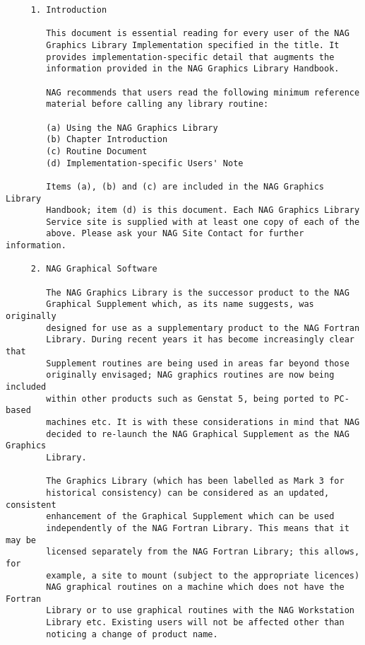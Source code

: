 \begin{verbatim}
     1. Introduction
     
        This document is essential reading for every user of the NAG
        Graphics Library Implementation specified in the title. It
        provides implementation-specific detail that augments the
        information provided in the NAG Graphics Library Handbook.
     
        NAG recommends that users read the following minimum reference
        material before calling any library routine:

        (a) Using the NAG Graphics Library
        (b) Chapter Introduction
        (c) Routine Document
        (d) Implementation-specific Users' Note
     
        Items (a), (b) and (c) are included in the NAG Graphics Library
        Handbook; item (d) is this document. Each NAG Graphics Library
        Service site is supplied with at least one copy of each of the
        above. Please ask your NAG Site Contact for further information.

     2. NAG Graphical Software
     
        The NAG Graphics Library is the successor product to the NAG
        Graphical Supplement which, as its name suggests, was originally
        designed for use as a supplementary product to the NAG Fortran
        Library. During recent years it has become increasingly clear that
        Supplement routines are being used in areas far beyond those
        originally envisaged; NAG graphics routines are now being included
        within other products such as Genstat 5, being ported to PC-based
        machines etc. It is with these considerations in mind that NAG
        decided to re-launch the NAG Graphical Supplement as the NAG Graphics
        Library.
     
        The Graphics Library (which has been labelled as Mark 3 for
        historical consistency) can be considered as an updated, consistent
        enhancement of the Graphical Supplement which can be used
        independently of the NAG Fortran Library. This means that it may be
        licensed separately from the NAG Fortran Library; this allows, for
        example, a site to mount (subject to the appropriate licences)
        NAG graphical routines on a machine which does not have the Fortran
        Library or to use graphical routines with the NAG Workstation
        Library etc. Existing users will not be affected other than
        noticing a change of product name.
     

\end{verbatim}
